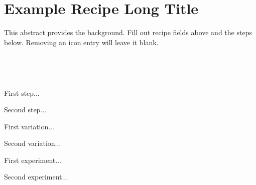 \section[Example Recipe]{Example Recipe Long Title~}


\begin{recipestats}[
	servings=servings,
	preptime=preparation time,
	bakingtime=cook time,
	inactivetime=inactive time,
	source=source / author,
	original=original source,
]
\end{recipestats}

\begin{recipeabstract}
	This abstract provides the background.
	Fill out recipe fields above and the steps below.
	Removing an icon entry will leave it blank.
\end{recipeabstract}


\begin{ingredientcolumns}
	\begin{ingredientblock}
		\\
	\end{ingredientblock}

	\begin{ingredientblock}
		\\
	\end{ingredientblock}
\end{ingredientcolumns}


\begin{preparation}
\item First step$\ldots$
\item Second step$\ldots$
\end{preparation}


\begin{variation}
\item First variation$\ldots$
\item Second variation$\ldots$
\end{variation}


\begin{experiments}
\item First experiment$\ldots$
\item Second experiment$\ldots$
\end{experiments}


\recipeend%
